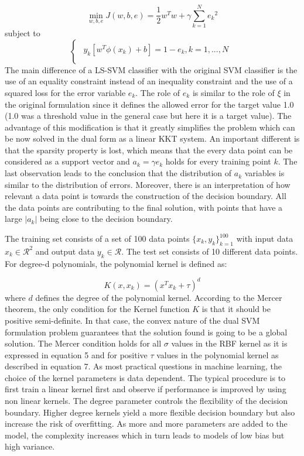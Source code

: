 \documentclass[conference,compsoc]{IEEEtran}
\begin{document}
\begin{equation}
\min\limits_{w,b,e} J(w,b,e) = \frac{1}{2}w^Tw + \gamma \sum_{k=1}^{N}{e_k}^2
\end{equation}
subject to
\begin{equation*}
\begin{cases}
\begin{aligned}
  y_k[w^T\phi(x_k)+b] = 1-{e_k}, k=1,...,N \\
\end{aligned}
\end{cases}
\end{equation*}
The main difference of a LS-SVM classifier with the original SVM classifier is the use of an equality constraint instead of an inequality constraint and the use of a squared loss for the error variable $e_k$. The role of $e_k$ is similar to the role of $\xi$ in the original formulation since it defines the allowed error for the target value 1.0 (1.0 was a threshold value in the general case but here it is a target value). The advantage of this modification is that it greatly simplifies the problem which can be now solved in the dual form as a linear KKT system. An important different is that the sparsity property is lost, which means that the every data point can be considered as a support vector and $a_k=\gamma e_k$ holds for every training point $k$. The last observation leads to the conclusion that the distribution of $a_k$ variables is similar to the distribution of errors. Moreover, there is an interpretation of how relevant a data point is towards the construction of the decision boundary. All the data points are contributing to the final solution, with points that have a large $|a_k|$ being close to the decision boundary. 


The training set consists of a set of 100 data points $\{x_k,y_k\}^{100}_{k=1}$ with input data $x_k \in \mathcal{R}^2 $ and output data $y_k \in \mathcal{R} $. The test set consists of 10 different data points. For degree-d polynomials, the polynomial kernel is defined as:


\begin{equation}
K(x,x_k) = (x^Tx_k +\tau)^d
\end{equation}
where $d$ defines the degree of the polynomial kernel. According to the Mercer theorem, the only condition for the Kernel function $K$ is that it should be positive semi-definite. In that case, the convex nature of the dual SVM formulation problem guarantees that the solution found is going to be a global solution. The Mercer condition holds for all $\sigma$ values in the RBF kernel as it is expressed in equation 5 and for positive $\tau$ values in the polynomial kernel as described in equation 7. As most practical questions in machine learning, the choice of the kernel parameters is data dependent. The typical procedure is to first train a linear kernel first and observe if performance is improved by using non linear kernels. 
The degree parameter controls the flexibility of the decision boundary. Higher degree kernels yield a more flexible decision boundary but also increase the risk of overfitting. As more and more parameters are added to the model, the complexity increases which in turn leads to models of low bias but high variance.
\end{document}

